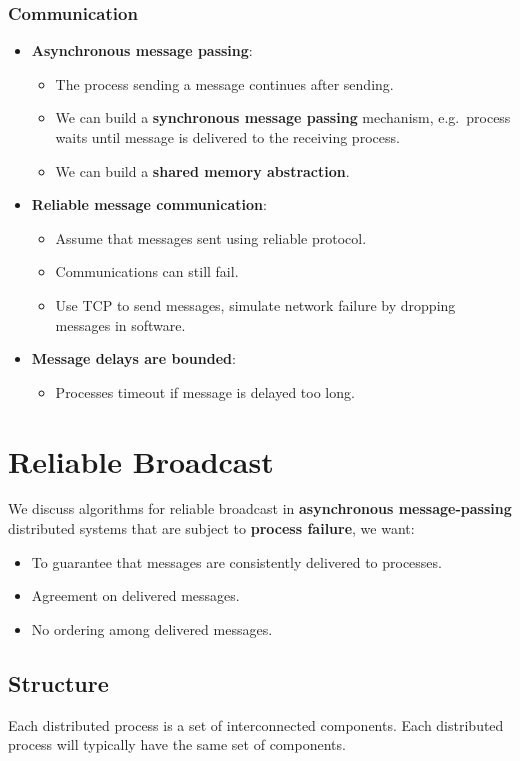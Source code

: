 \documentclass[11pt]{article}
\begin{document}
\subsubsection{Communication}
\begin{itemize}
  \item \textbf{Asynchronous message passing}:
    \begin{itemize}
      \item The process sending a message continues after sending.
      \item We can build a \textbf{synchronous message passing} mechanism, e.g.\ process waits until message is delivered to the receiving process.
      \item We can build a \textbf{shared memory abstraction}.
    \end{itemize}
  \item \textbf{Reliable message communication}:
    \begin{itemize}
      \item Assume that messages sent using reliable protocol.
      \item Communications can still fail.
      \item Use TCP to send messages, simulate network failure by dropping messages in software.
    \end{itemize}
  \item \textbf{Message delays are bounded}:
    \begin{itemize}
      \item Processes timeout if message is delayed too long.
    \end{itemize}
\end{itemize}

\section{Reliable Broadcast}
We discuss algorithms for reliable broadcast in \textbf{asynchronous message-passing} distributed systems that are subject to \textbf{process failure}, we want:
\begin{itemize}
  \item To guarantee that messages are consistently delivered to processes.
  \item Agreement on delivered messages.
  \item No ordering among delivered messages.
\end{itemize}

\subsection{Structure}
Each distributed process is a set of interconnected components.
Each distributed process will typically have the same set of components.
\end{document}
